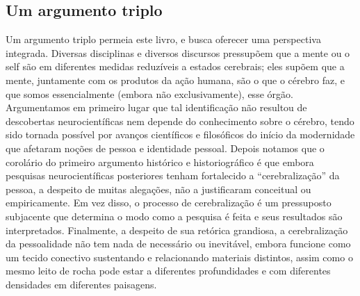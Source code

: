 \subsection{Um argumento triplo}

Um argumento triplo permeia este livro, e busca oferecer uma perspectiva
integrada. Diversas disciplinas e diversos discursos pressupõem que a
mente ou o self são em diferentes medidas reduzíveis a estados
cerebrais; eles supõem que a mente, juntamente com os produtos da ação
humana, são o que o cérebro faz, e que somos essencialmente (embora não
exclusivamente), esse órgão. Argumentamos em primeiro lugar que tal
identificação não resultou de descobertas neurocientíficas nem depende
do conhecimento sobre o cérebro, tendo sido tornada possível por avanços
científicos e filosóficos do início da modernidade que afetaram noções
de pessoa e identidade pessoal. Depois notamos que o corolário do
primeiro argumento histórico e historiográfico é que embora pesquisas
neurocientíficas posteriores tenham fortalecido a ``cerebralização'' da
pessoa, a despeito de muitas alegações, não a justificaram conceitual ou
empiricamente. Em vez disso, o processo de cerebralização é um
pressuposto subjacente que determina o modo como a pesquisa é feita e
seus resultados são interpretados. Finalmente, a despeito de sua
retórica grandiosa, a cerebralização da pessoalidade não tem nada de
necessário ou inevitável, embora funcione como um tecido conectivo
sustentando e relacionando materiais distintos, assim como o mesmo leito
de rocha pode estar a diferentes profundidades e com diferentes
densidades em diferentes paisagens.

